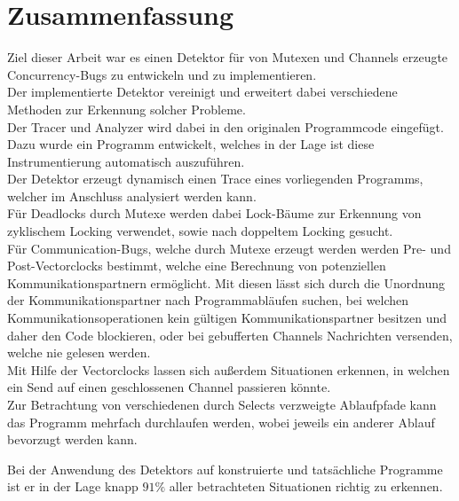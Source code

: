 \chapter{Zusammenfassung}\label{chap:conclusion}
Ziel dieser Arbeit war es einen Detektor für von Mutexen 
und Channels erzeugte Concurrency-Bugs zu entwickeln und zu implementieren.\\
Der implementierte Detektor vereinigt und erweitert dabei verschiedene Methoden 
zur Erkennung solcher Probleme.\\
Der Tracer und Analyzer wird dabei in den originalen Programmcode eingefügt.
Dazu wurde ein Programm entwickelt, welches in der Lage ist diese Instrumentierung
automatisch auszuführen.\\
Der Detektor erzeugt dynamisch einen Trace 
eines vorliegenden Programms, welcher im Anschluss analysiert werden kann.\\
Für Deadlocks durch Mutexe werden dabei Lock-Bäume zur Erkennung von zyklischem 
Locking verwendet, sowie nach doppeltem Locking gesucht.\\
Für Communication-Bugs, welche durch Mutexe erzeugt werden
werden Pre- und Post-Vectorclocks bestimmt, welche eine Berechnung
von potenziellen Kommunikationspartnern ermöglicht. Mit diesen lässt sich 
durch die Unordnung der Kommunikationspartner nach Programmabläufen suchen, 
bei welchen Kommunikationsoperationen kein gültigen Kommunikationspartner 
besitzen und daher den Code blockieren, oder bei gebufferten Channels 
Nachrichten versenden, welche nie gelesen werden. \\
Mit Hilfe der Vectorclocks lassen sich außerdem Situationen erkennen, 
in welchen ein Send auf einen geschlossenen Channel passieren könnte.\\
Zur Betrachtung von verschiedenen durch Selects verzweigte Ablaufpfade
kann das Programm mehrfach durchlaufen werden, wobei jeweils ein 
anderer Ablauf bevorzugt werden kann.

Bei der Anwendung des Detektors auf konstruierte und tatsächliche Programme 
ist er in der Lage knapp $91\%$ aller betrachteten 
Situationen richtig zu erkennen. 